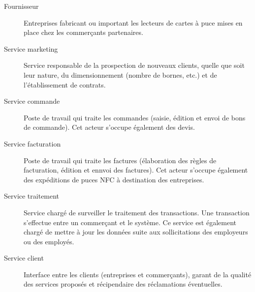 \begin{description}
  \item[Fournisseur] Entreprises fabricant ou important les lecteurs de cartes
    à puce mises en place chez les commerçants partenaires.
  \item[Service marketing] Service responsable de la prospection de nouveaux
    clients, quelle que soit leur nature, du dimensionnement (nombre de bornes,
    etc.) et de l’établissement de contrats.
  \item[Service commande] Poste de travail qui traite les commandes (saisie,
    édition et envoi de bons de commande). Cet acteur s’occupe également des
    devis.
  \item[Service facturation] Poste de travail qui traite les factures
    (élaboration des règles de facturation, édition et ennvoi des factures).
    Cet acteur s’occupe également des expéditions de puces NFC à destination
    des entreprises.
  \item[Service traitement] Service chargé de surveiller le traitement des
    transactions. Une transaction s’effectue entre un commerçant et le système.
    Ce service est également chargé de mettre à jour les données suite aux
    sollicitations des employeurs ou des employés.
  \item[Service client] Interface entre les clients (entreprises
    et commerçants), garant de la qualité des services proposés et récipendaire
    des réclamations éventuelles.
\end{description}



